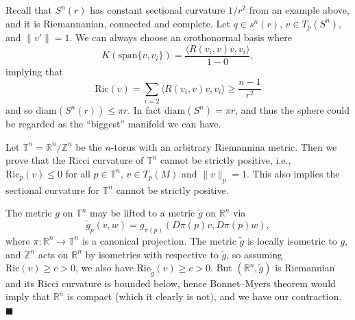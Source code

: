 \documentclass[letter-paper]{tufte-book}
\newenvironment{example}[1][Example]{\begin{trivlist}
\item[\hskip \labelsep {\bfseries #1}]}{\end{trivlist}}
\newcommand{\qed}{\hfill$\blacksquare$}
\begin{document}
\begin{example}
  Recall that $S^n(r)$ has constant sectional curvature $1/r^2$ from an example above, and it is Riemannanian, connected and complete. Let $q \in s^n(r)$, $v\in T_p(S^n)$, and $\|v'\|=1$. We can always choose an orothonormal basis where
  \begin{equation*}
    K(\mbox{span}\{v, v_i\}) = \frac{\langle R(v_i, v)v, v_i\rangle}{1 - 0},
  \end{equation*}
  implying that
  \begin{equation*}
    \mbox{Ric}(v) = \sum_{i=2} \langle R(v_i, v)v, v_i\rangle \geq \frac{n-1}{r^2}
  \end{equation*}
  and so $\mbox{diam}(S^n(r)) \leq \pi r$. In fact $\mbox{diam}(S^n) = \pi r$, and thus the sphere could be regarded as the ``biggest'' manifold we can have.
\end{example}

\begin{example}
 Let $\mathbb{T}^n = \mathbb{R}^n / \mathbb{Z}^n$ be the $n$-torus with an arbitrary Riemannina metric. Then we prove that the Ricci curvature of $\mathbb{T}^n$ cannot be strictly positive, i.e., $\mbox{Ric}_p(v) \leq 0$ for all $p\in \mathbb{T}^n$, $v\in T_p(M)$ and $\|v\|_p=1$. This also implies the sectional curvature for $\mathbb{T}^n$ cannot be strictly positive.
 
 The metric $g$ on $\mathbb{T}^n$ may be lifted to a metric $\tilde{g}$ on $\mathbb{R}^n$ via
 \begin{equation*}
  \tilde{g}_p(v,w) = g_{\pi(p)}(D\pi(p) v, D\pi(p) w),
 \end{equation*}
 where $\pi :\mathbb{R}^n \to \mathbb{T}^n$ is a canonical projection. The metric $\tilde{g}$ is locally isometric to $g$, and $\mathbb{Z}^n$ acts on $\mathbb{R}^n$ by isometries with respective to $\tilde{g}$, so assuming $\mbox{Ric}(v) \geq c > 0$, we also have $\mbox{Ric}_{\tilde{g}}(v) \geq c > 0$. But $(\mathbb{R}^n, \tilde{g})$ is Riemannian and its Ricci curvature is bounded below, hence Bonnet--Myers theorem would imply that $\mathbb{R}^n$ is compact (which it clearly is not), and we have our contraction. \qed
\end{example}




\end{document}
